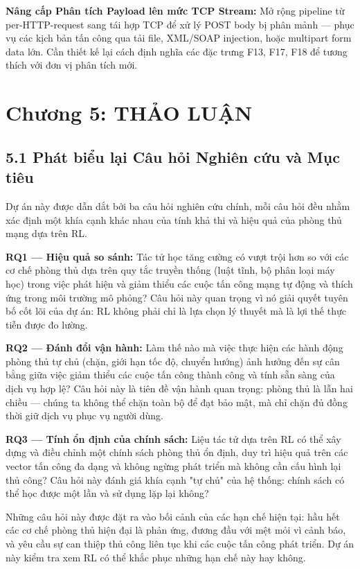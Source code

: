 \documentclass[12pt,a4paper,twoside]{report}
\begin{document}
{{{{{{{{{\textbf{Nâng cấp Phân tích Payload lên mức TCP Stream:} Mở rộng pipeline từ per-HTTP-request sang tái hợp TCP để xử lý POST body bị phân mảnh — phục vụ các kịch bản tấn công qua tải file, XML/SOAP injection, hoặc multipart form data lớn. Cần thiết kế lại cách định nghĩa các đặc trưng F13, F17, F18 để tương thích với đơn vị phân tích mới.


\chapter{Chương 5: THẢO LUẬN}

\section{5.1 Phát biểu lại Câu hỏi Nghiên cứu và Mục tiêu}

Dự án này được dẫn dắt bởi ba câu hỏi nghiên cứu chính, mỗi câu hỏi đều nhằm xác định một khía cạnh khác nhau của tính khả thi và hiệu quả của phòng thủ mạng dựa trên RL.

\textbf{RQ1 — Hiệu quả so sánh:} Tác tử học tăng cường có vượt trội hơn so với các cơ chế phòng thủ dựa trên quy tắc truyền thống (luật tĩnh, bộ phân loại máy học) trong việc phát hiện và giảm thiểu các cuộc tấn công mạng tự động và thích ứng trong môi trường mô phỏng? Câu hỏi này quan trọng vì nó giải quyết tuyên bố cốt lõi của dự án: RL không phải chỉ là lựa chọn lý thuyết mà là lợi thế thực tiễn được đo lường.

\textbf{RQ2 — Đánh đổi vận hành:} Làm thế nào mà việc thực hiện các hành động phòng thủ tự chủ (chặn, giới hạn tốc độ, chuyển hướng) ảnh hưởng đến sự cân bằng giữa việc giảm thiểu các cuộc tấn công thành công và tính sẵn sàng của dịch vụ hợp lệ? Câu hỏi này là tiên đề vận hành quan trọng: phòng thủ là lẫn hai chiều — chúng ta không thể chặn toàn bộ để đạt bảo mật, mà chỉ chặn đủ đồng thời giữ dịch vụ phục vụ người dùng.

\textbf{RQ3 — Tính ổn định của chính sách:} Liệu tác tử dựa trên RL có thể xây dựng và điều chỉnh một chính sách phòng thủ ổn định, duy trì hiệu quả trên các vector tấn công đa dạng và không ngừng phát triển mà không cần cấu hình lại thủ công? Câu hỏi này đánh giá khía cạnh "tự chủ" của hệ thống: chính sách có thể học được một lần và sử dụng lặp lại không?

Những câu hỏi này được đặt ra vào bối cảnh của các hạn chế hiện tại: hầu hết các cơ chế phòng thủ hiện đại là phản ứng, đương đầu với mệt mỏi vì cảnh báo, và yêu cầu sự can thiệp thủ công liên tục khi các cuộc tấn công phát triển. Dự án này kiểm tra xem RL có thể khắc phục những hạn chế này hay không.


}}}}}}}}}
\end{document}
